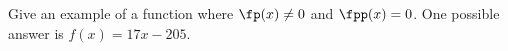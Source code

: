 {Give an example of a function where $\fp(x) \neq 0$ and $\fpp(x) = 0$.
}
{One possible answer is $f(x) = 17x-205$.
}

